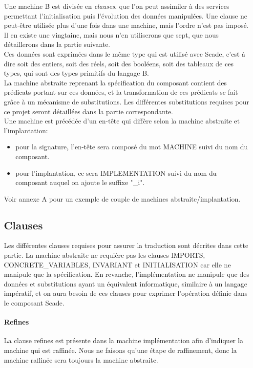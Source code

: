 Une machine B est divisée en \emph{clauses}, que l'on peut assimiler à
des services permettant l'initialisation puis l'évolution des données
manipulées. Une clause ne peut-être utilisée plus d'une fois dans une
machine, mais l'ordre n'est pas imposé. Il en existe une vingtaine,
mais nous n'en utiliserons que sept, que nous détaillerons dans la
partie suivante.\\ 
Ces données sont exprimées dans le même type qui est utilisé avec
Scade, c'est à dire soit des entiers, soit des réels, soit des
booléens, soit des tableaux de ces types, qui sont des types primitifs
du langage B. \\ 
La machine abstraite reprenant la spécification du composant contient
des prédicats portant sur ces données, et la transformation
de ces prédicats se fait grâce à un mécanisme de substitutions. Les
différentes substitutions requises pour ce projet seront détaillées
dans la partie correspondante. \\
Une machine est précédée d'un en-tête qui diffère selon la machine
abstraite et l'implantation:
\begin{itemize}
\item pour la signature, l'en-tête sera composé du mot MACHINE suivi
  du nom du composant.
\item pour l'implantation, ce sera IMPLEMENTATION suivi du nom du
  composant auquel on ajoute le suffixe "\_i".
\end{itemize}
Voir annexe A pour un exemple de couple de machines abstraite/implantation.



\subsection{Clauses}
Les différentes clauses requises pour assurer la traduction sont
décrites dans cette partie. La machine abstraite ne requière pas les
clauses IMPORTS, CONCRETE\_VARIABLES, INVARIANT et INITIALISATION car
elle ne manipule que la spécification. En revanche, l'implémentation ne
manipule que des données et substitutions ayant un équivalent
informatique, similaire à un langage impératif, et on aura besoin de
ces clauses pour exprimer l'opération définie dans le composant Scade.

\paragraph{Refines}
La clause refines est présente dans la machine implémentation afin
d'indiquer la machine qui est raffinée. Nous ne faisons qu'une étape
de raffinement, donc la machine raffinée sera toujours la machine
abstraite. 

